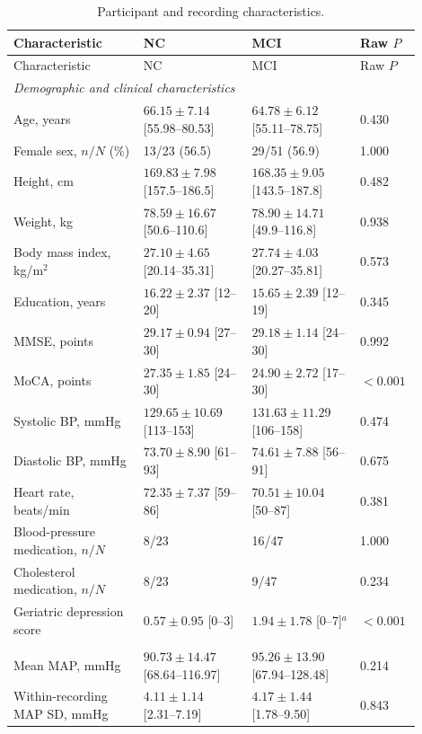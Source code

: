 \documentclass[12pt]{article}
\begin{document}
\begin{longtable}{p{0.30\linewidth}p{0.25\linewidth}p{0.25\linewidth}p{0.10\linewidth}}
\caption{Participant and recording characteristics.}
\label{tab:participants}\\
\toprule
Characteristic & NC & MCI & Raw $P$ \\
\midrule
\endfirsthead
\toprule
Characteristic & NC & MCI & Raw $P$ \\
\midrule
\endhead
\multicolumn{4}{l}{\textit{Demographic and clinical characteristics}}\\
Age, years & $66.15\pm7.14$ [55.98--80.53] & $64.78\pm6.12$ [55.11--78.75] & 0.430 \\
Female sex, $n/N$ (\%) & 13/23 (56.5) & 29/51 (56.9) & 1.000 \\
Height, cm & $169.83\pm7.98$ [157.5--186.5] & $168.35\pm9.05$ [143.5--187.8] & 0.482 \\
Weight, kg & $78.59\pm16.67$ [50.6--110.6] & $78.90\pm14.71$ [49.9--116.8] & 0.938 \\
Body mass index, kg/m$^2$ & $27.10\pm4.65$ [20.14--35.31] & $27.74\pm4.03$ [20.27--35.81] & 0.573 \\
Education, years & $16.22\pm2.37$ [12--20] & $15.65\pm2.39$ [12--19] & 0.345 \\
MMSE, points & $29.17\pm0.94$ [27--30] & $29.18\pm1.14$ [24--30] & 0.992 \\
MoCA, points & $27.35\pm1.85$ [24--30] & $24.90\pm2.72$ [17--30] & $<0.001$ \\
Systolic BP, mmHg & $129.65\pm10.69$ [113--153] & $131.63\pm11.29$ [106--158] & 0.474 \\
Diastolic BP, mmHg & $73.70\pm8.90$ [61--93] & $74.61\pm7.88$ [56--91] & 0.675 \\
Heart rate, beats/min & $72.35\pm7.37$ [59--86] & $70.51\pm10.04$ [50--87] & 0.381 \\
Blood-pressure medication, $n/N$ & 8/23 & 16/47 & 1.000 \\
Cholesterol medication, $n/N$ & 8/23 & 9/47 & 0.234 \\
Geriatric depression score & $0.57\pm0.95$ [0--3] & $1.94\pm1.78$ [0--7]$^{a}$ & $<0.001$ \\
\addlinespace
\multicolumn{4}{l}{\textit{Physiological recording and analysis characteristics}}\\
Mean MAP, mmHg & $90.73\pm14.47$ [68.64--116.97] & $95.26\pm13.90$ [67.94--128.48] & 0.214 \\
Within-recording MAP SD, mmHg & $4.11\pm1.14$ [2.31--7.19] & $4.17\pm1.44$ [1.78--9.50] & 0.843 \\

\end{longtable}
\end{document}
